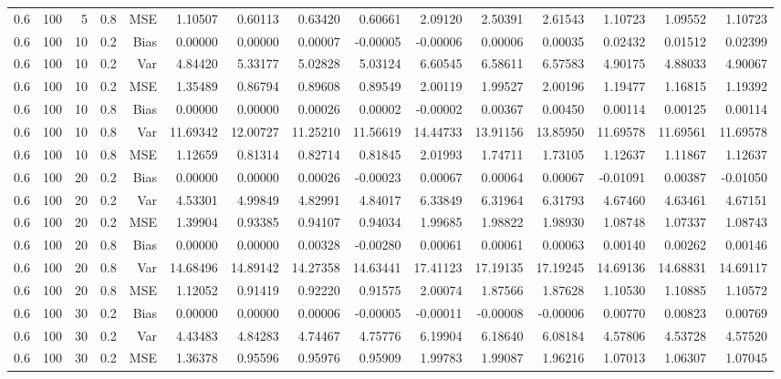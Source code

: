 \begin{table}[!htbp]
\begin{tabular}{lrrrrrrrrrrrrrr}
0.6 & 100 &  5 & 0.8 & MSE & 1.10507 & 0.60113 & 0.63420 & 0.60661 & 2.09120 & 2.50391 & 2.61543 & 1.10723 & 1.09552 & 1.10723 \\
0.6 & 100 & 10 & 0.2 & Bias & 0.00000 & 0.00000 & 0.00007 & -0.00005 & -0.00006 & 0.00006 & 0.00035 & 0.02432 & 0.01512 & 0.02399 \\
0.6 & 100 & 10 & 0.2 & Var & 4.84420 & 5.33177 & 5.02828 & 5.03124 & 6.60545 & 6.58611 & 6.57583 & 4.90175 & 4.88033 & 4.90067 \\
0.6 & 100 & 10 & 0.2 & MSE & 1.35489 & 0.86794 & 0.89608 & 0.89549 & 2.00119 & 1.99527 & 2.00196 & 1.19477 & 1.16815 & 1.19392 \\
0.6 & 100 & 10 & 0.8 & Bias & 0.00000 & 0.00000 & 0.00026 & 0.00002 & -0.00002 & 0.00367 & 0.00450 & 0.00114 & 0.00125 & 0.00114 \\
0.6 & 100 & 10 & 0.8 & Var & 11.69342 & 12.00727 & 11.25210 & 11.56619 & 14.44733 & 13.91156 & 13.85950 & 11.69578 & 11.69561 & 11.69578 \\
0.6 & 100 & 10 & 0.8 & MSE & 1.12659 & 0.81314 & 0.82714 & 0.81845 & 2.01993 & 1.74711 & 1.73105 & 1.12637 & 1.11867 & 1.12637 \\
0.6 & 100 & 20 & 0.2 & Bias & 0.00000 & 0.00000 & 0.00026 & -0.00023 & 0.00067 & 0.00064 & 0.00067 & -0.01091 & 0.00387 & -0.01050 \\
0.6 & 100 & 20 & 0.2 & Var & 4.53301 & 4.99849 & 4.82991 & 4.84017 & 6.33849 & 6.31964 & 6.31793 & 4.67460 & 4.63461 & 4.67151 \\
0.6 & 100 & 20 & 0.2 & MSE & 1.39904 & 0.93385 & 0.94107 & 0.94034 & 1.99685 & 1.98822 & 1.98930 & 1.08748 & 1.07337 & 1.08743 \\
0.6 & 100 & 20 & 0.8 & Bias & 0.00000 & 0.00000 & 0.00328 & -0.00280 & 0.00061 & 0.00061 & 0.00063 & 0.00140 & 0.00262 & 0.00146 \\
0.6 & 100 & 20 & 0.8 & Var & 14.68496 & 14.89142 & 14.27358 & 14.63441 & 17.41123 & 17.19135 & 17.19245 & 14.69136 & 14.68831 & 14.69117 \\
0.6 & 100 & 20 & 0.8 & MSE & 1.12052 & 0.91419 & 0.92220 & 0.91575 & 2.00074 & 1.87566 & 1.87628 & 1.10530 & 1.10885 & 1.10572 \\
0.6 & 100 & 30 & 0.2 & Bias & 0.00000 & 0.00000 & 0.00006 & -0.00005 & -0.00011 & -0.00008 & -0.00006 & 0.00770 & 0.00823 & 0.00769 \\
0.6 & 100 & 30 & 0.2 & Var & 4.43483 & 4.84283 & 4.74467 & 4.75776 & 6.19904 & 6.18640 & 6.08184 & 4.57806 & 4.53728 & 4.57520 \\
0.6 & 100 & 30 & 0.2 & MSE & 1.36378 & 0.95596 & 0.95976 & 0.95909 & 1.99783 & 1.99087 & 1.96216 & 1.07013 & 1.06307 & 1.07045 \\

\end{tabular}
\end{table}
